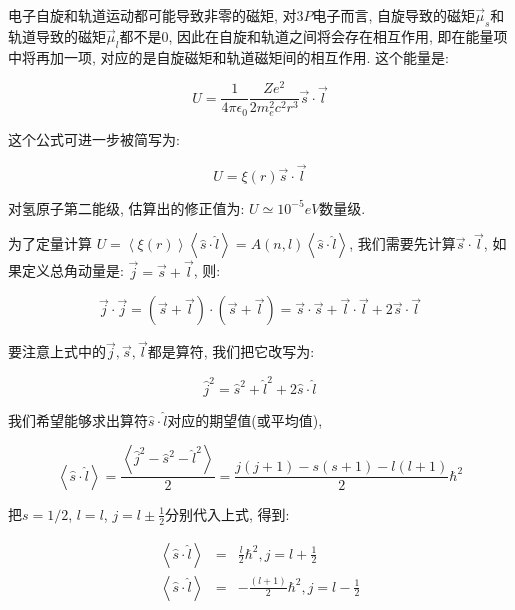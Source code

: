 电子自旋和轨道运动都可能导致非零的磁矩, 对$3P$电子而言,
自旋导致的磁矩$\vec \mu_s$和轨道导致的磁矩$\vec \mu_l$都不是0,
因此在自旋和轨道之间将会存在相互作用, 即在能量项中将再加一项,
对应的是自旋磁矩和轨道磁矩间的相互作用. 这个能量是:


\begin{equation}\label{spin-orbital coupling}
U =\frac{1}{4\pi \epsilon_0}\frac{Z e^2}{2 m_e^2 c^2 r^3} \vec s
\cdot \vec l
\end{equation}

这个公式可进一步被简写为:

\begin{equation*}
U = \xi(r) \vec s \cdot \vec l
\end{equation*}

对氢原子第二能级, 估算出的修正值为: $U \simeq 10^{-5}eV$数量级.

为了定量计算 $U = \left\langle \xi(r) \right\rangle \left\langle
\hat s \cdot \hat l \right\rangle = A(n,l)\left\langle \hat s \cdot
\hat l \right\rangle$, 我们需要先计算$\vec s \cdot \vec l$,
如果定义总角动量是: $\vec j = \vec s + \vec l$, 则:

\begin{equation*}
\vec j \cdot \vec j = (\vec s + \vec l)\cdot (\vec s + \vec l) =
\vec s \cdot \vec s + \vec l \cdot \vec l + 2 \vec s \cdot \vec l
\end{equation*}

要注意上式中的$\vec j, \vec s, \vec l$都是算符, 我们把它改写为:

\begin{equation*}
\hat j^2 = \hat s^2 + \hat l^2 + 2\hat s \cdot \hat l
\end{equation*}

我们希望能够求出算符$\hat s \cdot \hat l$对应的期望值(或平均值),

\begin{equation*}
\left\langle \hat s \cdot \hat l \right\rangle = \frac{\left\langle
\hat j^2 - \hat s^2 -\hat l^2 \right\rangle}{2} =
\frac{j(j+1)-s(s+1)-l(l+1)}{2}\hbar^2
\end{equation*}

把$s=1/2$, $l=l$, $j=l\pm \frac{1}{2}$分别代入上式, 得到:

\begin{eqnarray*}
  \left\langle \hat s \cdot \hat l \right\rangle &=& \frac{l}{2}\hbar^2, j=l+\frac{1}{2} \\
  \left\langle \hat s \cdot \hat l \right\rangle &=&
  -\frac{(l+1)}{2}\hbar^2, j=l-\frac{1}{2}
\end{eqnarray*}

